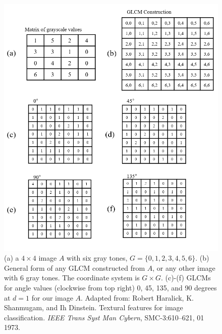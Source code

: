 \documentclass{article}
\begin{document}
    \begin{figure}[t]
      \includegraphics[width=\linewidth]{matrix_fig.PNG}
      \caption{ (a) a $4 \times 4$ image $A$ with six gray tones, $G = \{0, 1, 2, 3, 4, 5, 6\}$. (b) General form of any GLCM constructed from $A$, or any other image with 6 gray tones. The coordinate system is $G \times G$. (c)-(f) GLCMs for angle values (clockwise from top right) 0, 45, 135, and 90 degrees at $d = 1$ for our image $A$.  Adapted from: Robert Haralick, K. Shanmugam, and Ih Dinstein. Textural features for image classification. \textit{IEEE Trans Syst Man Cybern}, SMC-3:610–621, 01 1973. }
      \label{fig:matrix}
    \end{figure}
\end{document}
